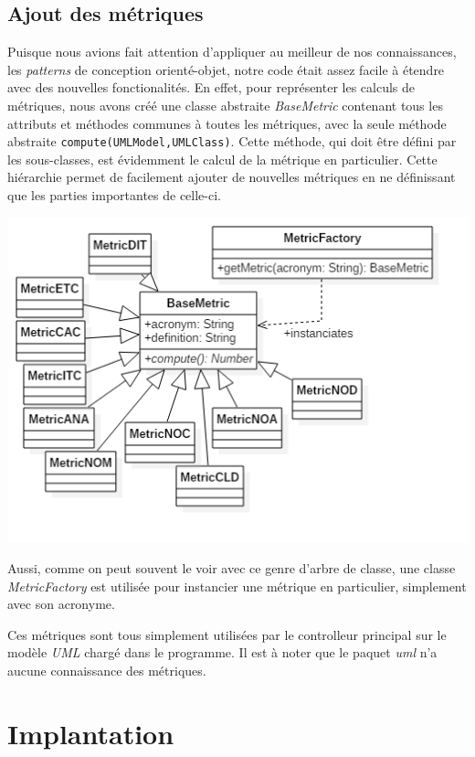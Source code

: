 \documentclass[letter,french]{report}
\begin{document}
	\subsection*{Ajout des métriques}
  Puisque nous avions fait attention d'appliquer au meilleur de nos
  connaissances, les \emph{patterns} de conception orienté-objet, notre code
  était assez facile à étendre avec des nouvelles fonctionalités. En effet, pour
  représenter les calculs de métriques, nous avons créé une classe abstraite
  \emph{BaseMetric} contenant tous les attributs et méthodes communes à toutes
  les métriques, avec la seule méthode abstraite
  \texttt{compute(UMLModel,UMLClass)}. Cette méthode, qui doit être défini par
  les sous-classes, est évidemment le calcul de la métrique en particulier.
  Cette hiérarchie permet de facilement ajouter de nouvelles métriques en ne
  définissant que les parties importantes de celle-ci.

	\includegraphics[scale=.5]{images/Metrics_diagram.png}

  Aussi, comme on peut souvent le voir avec ce genre d'arbre de classe, une
  classe \emph{MetricFactory} est utilisée pour instancier une métrique en
  particulier, simplement avec son acronyme.

  Ces métriques sont tous simplement utilisées par le controlleur principal
  sur le modèle \emph{UML} chargé dans le programme. Il est à noter que le
  paquet \emph{uml} n'a aucune connaissance des métriques.
	
	\section*{Implantation}
	
\end{document}
